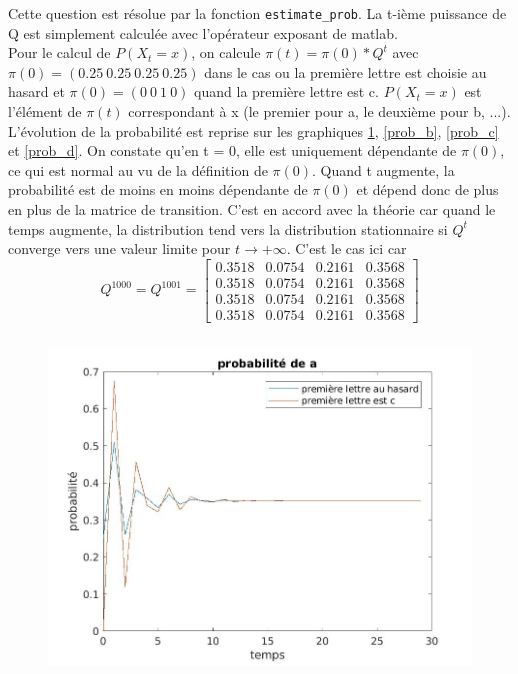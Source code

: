 \documentclass[11pt]{report}
\begin{document}
\subsubsection{}
Cette question est résolue par la fonction \texttt{estimate\_prob}. La t-ième puissance de Q est simplement calculée avec l'opérateur exposant de matlab.\\
Pour le calcul de $P(X_t = x)$, on calcule $\pi(t) = \pi(0)*Q^t$ avec $\pi(0) = (0.25\ 0.25\ 0.25\ 0.25)$ dans le cas ou la première lettre est choisie au hasard et $\pi(0) = (0\ 0\ 1\ 0)$ quand la première lettre est c. $P(X_t = x)$ est l'élément de $\pi(t)$ correspondant à x (le premier pour a, le deuxième pour b, ...).\\
L'évolution de la probabilité est reprise sur les graphiques \ref{prob_a}, \ref{prob_b}, \ref{prob_c} et \ref{prob_d}. On constate qu'en t = 0, elle est uniquement dépendante de $\pi(0)$, ce qui est normal au vu de la définition de $\pi(0)$. Quand t augmente, la probabilité est de moins en moins dépendante de $\pi(0)$ et dépend donc de plus en plus de la matrice de transition. C'est en accord avec la théorie car quand le temps augmente, la distribution tend vers la distribution stationnaire si $Q^t$ converge vers une valeur limite pour $t \rightarrow +\infty$. C'est le cas ici car 
$$Q^{1000} = Q^{1001} =
\begin{bmatrix}
0.3518 & 0.0754 & 0.2161 & 0.3568\\
0.3518 & 0.0754 & 0.2161 & 0.3568\\
0.3518 & 0.0754 & 0.2161 & 0.3568\\
0.3518 & 0.0754 & 0.2161 & 0.3568
\end{bmatrix}
$$ 
\begin{figure}[!h]
\begin{center}
\includegraphics[height = 9cm]{prob_a.jpg}
\caption{\label{prob_a}}
\end{center}
\end{figure}
\end{document}

